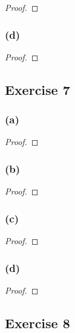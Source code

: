 \documentclass[14pt]{extarticle}
\begin{document}
\begin{proof}

\end{proof}

\subsubsection{(d)}

\begin{proof}

\end{proof}

\subsection{Exercise 7}

\subsubsection{(a)}

\begin{proof}

\end{proof}

\subsubsection{(b)}

\begin{proof}

\end{proof}

\subsubsection{(c)}

\begin{proof}

\end{proof}

\subsubsection{(d)}

\begin{proof}

\end{proof}

\subsection{Exercise 8}
\end{document}
